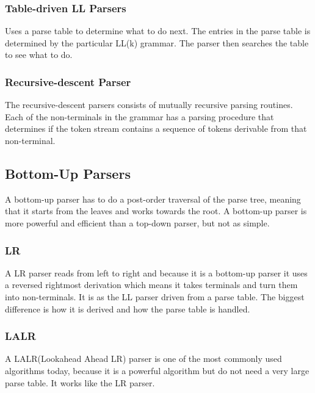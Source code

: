\subsubsection*{Table-driven LL Parsers}
Uses a parse table to determine what to do next. The entries in the parse table is determined by the particular LL(k) grammar. The parser then searches the table to see what to do.

\subsubsection*{Recursive-descent Parser}
The recursive-descent parsers consists of mutually recursive parsing routines. Each of the non-terminals in the grammar has a parsing procedure that determines if the token stream contains a sequence of tokens derivable from that non-terminal.

\subsection{Bottom-Up Parsers}
A bottom-up parser has to do a post-order traversal of the parse tree, meaning that it starts from the leaves and works towards the root.
A bottom-up parser is more powerful and efficient than a top-down parser, but not as simple.

\subsubsection*{LR}
A LR parser reads from left to right and because it is a bottom-up parser it uses a reversed rightmost derivation which means it takes terminals and turn them into non-terminals. It is as the LL parser driven from a parse table. The biggest difference is how it is derived and how the parse table is handled.  

\subsubsection*{LALR}
A LALR(Lookahead Ahead LR) parser is one of the most commonly used algorithms today, because it is a powerful algorithm but do not need a very large parse table. It works like the LR parser.
